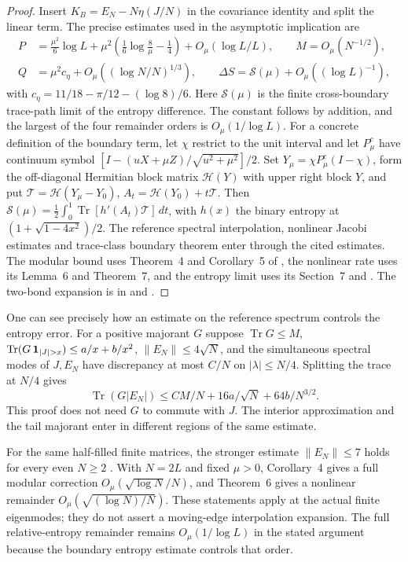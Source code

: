 \documentclass[11pt,letterpaper]{article}
\newcommand{\tr}{\operatorname{Tr}}\newcommand{\TV}{\operatorname{TV}}\newcommand{\E}{\mathbb E}\newcommand{\id}{\mathbb I}\newcommand{\calB}{\mathcal B}\newcommand{\norm}[1]{\left\lVert#1\right\rVert}
\begin{document}
\begin{proof}
Insert $K_B=E_N-N\eta(J/N)$ in the covariance identity and split the linear term. The precise estimates used in the asymptotic implication are
\begin{align*}
 P&=\frac{\mu^2}{6}\log L+
 \mu^2\left(\frac16\log\frac8\mu-\frac14\right)+O_\mu(\log L/L),\qquad
 M=O_\mu(N^{-1/2}),\\
 Q&=\mu^2 c_\eta+O_\mu((\log N/N)^{1/3}),\qquad
 \Delta S=\mathcal S(\mu)+O_\mu((\log L)^{-1}),
\end{align*}
with $c_\eta=11/18-\pi/12-(\log8)/6$. Here $\mathcal S(\mu)$ is the finite cross-boundary trace-path limit of the entropy difference. The constant follows by addition, and the largest of the four remainder orders is $O_\mu(1/\log L)$. For a concrete definition of the boundary term, let $\chi$ restrict to the unit interval and let $P_\mu^c$ have continuum symbol $[I-(uX+\mu Z)/\sqrt{u^2+\mu^2}]/2$. Set $Y_\mu=\chi P_\mu^c(I-\chi)$, form the off-diagonal Hermitian block matrix $\mathcal H(Y)$ with upper right block $Y$, and put $\mathcal T=\mathcal H(Y_\mu-Y_0)$, $A_t=\mathcal H(Y_0)+t\mathcal T$. Then $\mathcal S(\mu)=\tfrac12\int_0^1\tr[h'(A_t)\mathcal T]\,dt$, with $h(x)$ the binary entropy at $(1+\sqrt{1-4x^2})/2$. The reference spectral interpolation, nonlinear Jacobi estimates and trace-class boundary theorem enter through the cited estimates. The modular bound uses Theorem~4 and Corollary~5 of \cite{justuswilson}, the nonlinear rate uses its Lemma~6 and Theorem~7, and the entropy limit uses its Section~7 and \cite{crossboundary}. The two-bond expansion is in \cite{relative} and \cite{referencegeometry}.
\end{proof}

One can see precisely how an estimate on the reference spectrum controls the entropy error. For a positive majorant $G$ suppose $\tr G\le M$, $\tr(G\,{\bf1}_{|J|>x})\le a/x+b/x^2$, $\|E_N\|\le4\sqrt N$, and the simultaneous spectral modes of $J,E_N$ have discrepancy at most $C/N$ on $|\lambda|\le N/4$. Splitting the trace at $N/4$ gives
\[
 \tr(G|E_N|)\le CM/N+16a/\sqrt N+64b/N^{3/2}.
\]
This proof does not need $G$ to commute with $J$. The interior approximation and the tail majorant enter in different regions of the same estimate.

For the same half-filled finite matrices, the stronger estimate $\|E_N\|\le7$ holds for every even $N\ge2$ \cite[Theorem~3]{uniformmodular}. With $N=2L$ and fixed $\mu>0$, Corollary~4 gives a full modular correction $O_\mu(\sqrt{\log N}/N)$, and Theorem~6 gives a nonlinear remainder $O_\mu(\sqrt{(\log N)/N})$. These statements apply at the actual finite eigenmodes; they do not assert a moving-edge interpolation expansion. The full relative-entropy remainder remains $O_\mu(1/\log L)$ in the stated argument because the boundary entropy estimate controls that order.
\end{document}
